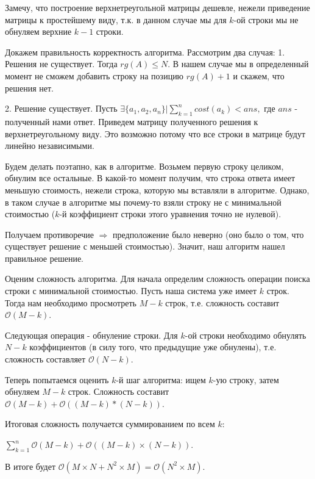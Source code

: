 \documentclass[12pt]{article}
\begin{document}
	Замечу, что построение верхнетреугольной матрицы дешевле, нежели приведение матрицы к простейшему виду, т.к. в данном случае мы для $k$-ой строки мы не обнуляем верхние $k - 1$ строки.
	
	Докажем правильность корректность алгоритма. Рассмотрим два случая:
	1. Решения не существует. Тогда $rg(A) \leq N$. В нашем случае мы в определенный момент не сможем добавить строку на позицию $rg(A) + 1$ и скажем, что решения нет.
	
	2. Решение существует. Пусть $\exists \{a_1, a_2, a_n\}| \sum\limits_{k = 1}^{n} cost(a_k) < ans,$ где $ans$ - полученный нами ответ. Приведем матрицу полученного решения к верхнетреугольному виду. Это возможно потому что все строки в матрице будут линейно независимыми. 
	
	Будем делать поэтапно, как в алгоритме. Возьмем первую строку целиком, обнулим все остальные. В какой-то момент получим, что строка ответа имеет меньшую стоимость, нежели строка, которую мы вставляли в алгоритме. Однако, в таком случае в алгоритме мы почему-то взяли строку не с минимальной стоимостью ($k$-й коэффициент строки этого уравнения точно не нулевой). 
	
	Получаем противоречие $\Rightarrow$ предположение было неверно (оно было о том, что существует решение с меньшей стоимостью). Значит, наш алгоритм нашел правильное решение.
	
	Оценим сложность алгоритма.  Для начала определим сложность операции поиска строки с минимальной стоимостью. Пусть наша система уже имеет $k$ строк. Тогда нам необходимо просмотреть $M - k$ строк, т.е. сложность составит $\mathcal{O} (M - k)$. 
	
	Следующая операция - обнуление строки. Для $k$-ой строки необходимо обнулять $N-k$ коэффициентов (в силу того, что предыдущие уже обнулены), т.е. сложность составляет $\mathcal{O} (N - k)$.
	
	Теперь попытаемся оценить $k$-й шаг алгоритма: ищем $k$-ую строку, затем обнуляем $M-k$ строк. Сложность составит $\mathcal{O}(M - k) + \mathcal{O}((M - k) * (N - k)) $.
	
	Итоговая сложность получается суммированием по всем $k$: 
	\begin{center}
		$\sum\limits_{k = 1}^{n} \mathcal{O}(M - k) + \mathcal{O}((M - k) \times (N - k)) $.
	\end{center}

	В итоге будет $\mathcal{O} (M \times N + N^2 \times M) = \mathcal{O}(N^2 \times M).$
\end{document}
